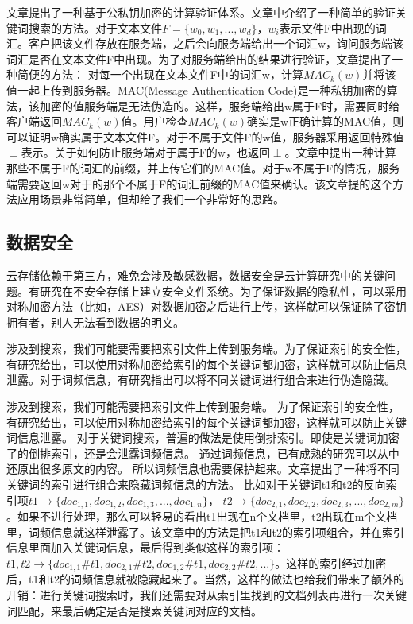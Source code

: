 文章\cite{benabbas2011verifiable}提出了一种基于公私钥加密的计算验证体系。文章中介绍了一种简单的验证关键词搜索的方法。对于文本文件$F = \{w_0,w_1,...,w_d\}$，$w_i$表示文件F中出现的词汇。客户把该文件存放在服务端，之后会向服务端给出一个词汇w，询问服务端该词汇是否在文本文件F中出现。为了对服务端给出的结果进行验证，文章提出了一种简便的方法：
对每一个出现在文本文件F中的词汇w，计算$MAC_k(w)$并将该值一起上传到服务器。MAC(Message Authentication Code)是一种私钥加密的算法，该加密的值服务端是无法伪造的。这样，服务端给出w属于F时，需要同时给客户端返回$MAC_k(w)$值。用户检查$MAC_k(w)$确实是w正确计算的MAC值，则可以证明w确实属于文本文件F。对于不属于文件F的w值，服务器采用返回特殊值$\perp$表示。关于如何防止服务端对于属于F的w，也返回$\perp$。文章中提出一种计算那些不属于F的词汇的前缀，并上传它们的MAC值。对于w不属于F的情况，服务端需要返回w对于的那个不属于F的词汇前缀的MAC值来确认。该文章提的这个方法应用场景非常简单，但却给了我们一个非常好的思路。

\subsection{数据安全}
云存储依赖于第三方，难免会涉及敏感数据，数据安全是云计算研究中的关键问题。有研究在不安全存储上建立安全文件系统。为了保证数据的隐私性，可以采用对称加密方法（比如，AES）对数据加密之后进行上传，这样就可以保证除了密钥拥有者，别人无法看到数据的明文。

涉及到搜索，我们可能要需要把索引文件上传到服务端。为了保证索引的安全性，有研究给出，可以使用对称加密给索引的每个关键词都加密，这样就可以防止信息泄露。对于词频信息，有研究指出可以将不同关键词进行组合来进行伪造隐藏。

涉及到搜索，我们可能需要把索引文件上传到服务端。
为了保证索引的安全性，有研究给出，可以使用对称加密给索引的每个关键词都加密，这样就可以防止关键词信息泄露。
对于关键词搜索，普遍的做法是使用倒排索引。即使是关键词加密了的倒排索引，还是会泄露词频信息。
通过词频信息，已有成熟的研究可以从中还原出很多原文的内容。
所以词频信息也需要保护起来。文章\cite{zerr2008zerber}提出了一种将不同关键词的索引进行组合来隐藏词频信息的方法。
比如对于关键词t1和t2的反向索引项$t1 \to \{doc_{1,1},doc_{1,2},doc_{1,3},...,doc_{1,n}\}$， $t2 \to \{doc_{2,1},doc_{2,2},doc_{2,3},...,doc_{2,m}\}$。如果不进行处理，那么可以轻易的看出t1出现在n个文档里，t2出现在m个文档里，词频信息就这样泄露了。该文章中的方法是把t1和t2的索引项组合，并在索引信息里面加入关键词信息，最后得到类似这样的索引项：$t1,t2 \to \{doc_{1,1}\#t1,doc_{2,1}\#t2,doc_{1,2}\#t1,doc_{2,2}\#t2,...\}$。这样的索引经过加密后，t1和t2的词频信息就被隐藏起来了。当然，这样的做法也给我们带来了额外的开销：进行关键词搜索时，我们还需要对从索引里找到的文档列表再进行一次关键词匹配，来最后确定是否是搜索关键词对应的文档。

